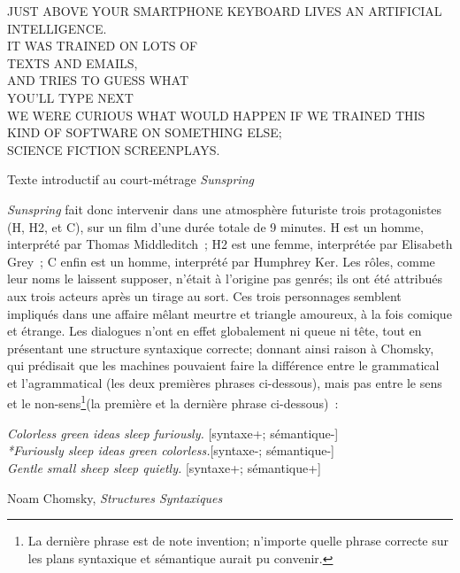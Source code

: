 \documentclass{article}
\newenvironment{citationbox}
{\begin{center}
		\begin{minipage}{.8\textwidth}
		}
		{
		\end{minipage}	
\end{center}
}
\begin{document}
					\begin{citationbox}
						JUST ABOVE YOUR SMARTPHONE KEYBOARD LIVES AN ARTIFICIAL INTELLIGENCE.\\
						IT WAS TRAINED ON LOTS OF\\
						TEXTS AND EMAILS,\\
						AND TRIES TO GUESS WHAT\\
						YOU'LL TYPE NEXT\\
						
						WE WERE CURIOUS WHAT WOULD HAPPEN IF WE TRAINED THIS KIND OF SOFTWARE ON SOMETHING ELSE;\\
						
						SCIENCE FICTION SCREENPLAYS.
						\begin{flushright}
							Texte introductif au court-métrage  \textit{Sunspring}
						\end{flushright}
					\end{citationbox}
					
					\textit{Sunspring} fait donc intervenir dans une atmosphère futuriste trois protagonistes (H, H2, et C), sur un film d'une durée totale de 9 minutes. H est un homme, interprété par Thomas Middleditch ; H2 est une femme, interprétée par Elisabeth Grey ; C enfin est un homme, interprété par Humphrey Ker. Les rôles, comme leur noms le laissent supposer, n'était à l'origine pas genrés; ils ont été attribués aux trois acteurs après un tirage au sort. Ces trois personnages semblent impliqués dans une affaire mêlant meurtre et triangle amoureux, à la fois comique et étrange. Les dialogues n'ont en effet globalement ni queue ni tête, tout en présentant une structure syntaxique correcte; donnant ainsi raison à Chomsky, qui prédisait que les machines pouvaient faire la différence entre le grammatical et l'agrammatical (les deux premières phrases ci-dessous), mais pas entre le sens et le non-sens\footnote{La dernière phrase est de note invention; n'importe quelle phrase correcte sur les plans syntaxique et sémantique aurait pu convenir.}(la première et la dernière phrase ci-dessous)~:
					\begin{citationbox}
						\textit{Colorless green ideas sleep furiously.} [syntaxe+; sémantique-]\\
						\textit{*Furiously sleep ideas green colorless.}[syntaxe-; sémantique-]\\
						\textit{Gentle small sheep sleep quietly.} [syntaxe+; sémantique+]
						\begin{flushright}
							Noam Chomsky, \textit{Structures Syntaxiques} \autocite{chomsky1979}
						\end{flushright}
					\end{citationbox}
					
\end{document}
